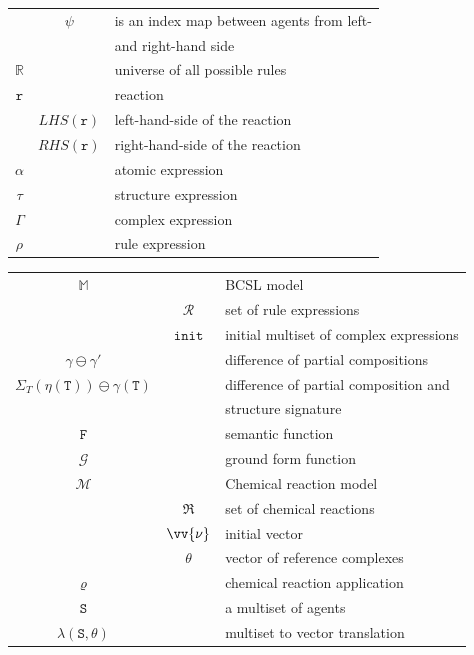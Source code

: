 \documentclass[12pt]{fithesis2}
\begin{document}
\begin{tabular}{c c | l}
 & $\psi$ & is an index map between agents from left-\\
 & & and right-hand side\\
$\mathds{R}$ & & universe of all possible rules\\
\hline 
$\mathtt{r}$ & & reaction\\
 & $LHS(\mathtt{r})$ & left-hand-side of the reaction\\
 & $RHS(\mathtt{r})$ & right-hand-side of the reaction\\
\hline 
$\alpha$ & & atomic expression\\
$\tau$ & & structure expression\\
$\Gamma$ & & complex expression\\
$\rho$ & & rule expression\\
\end{tabular}

\begin{tabular}{c c | l}
$\mathds{M}$ & & BCSL model\\
 & $\mathcal{R}$ & set of rule expressions\\
 & $\mathtt{init}$ & initial multiset of complex expressions\\
\hline 
$\gamma \ominus \gamma'$ & & difference of partial compositions\\
$\Sigma_T(\mathtt{\eta(\mathtt{T})}) \ominus \gamma(\mathtt{T})$ & & difference of partial composition and\\
 & & structure signature\\
 \hline 
$\mathtt{F}$ & & semantic function\\
$\mathcal{G}$ & & ground form function\\
\hline 
$\mathcal{M}$ & & Chemical reaction model\\
 & $\mathfrak{R}$ & set of chemical reactions\\
 & $\vv{\nu}$ & initial vector\\
 & $\theta$ & vector of reference complexes\\
\hline 
$\varrho$ & & chemical reaction application\\
$\mathtt{S}$ & & a multiset of agents\\
$\lambda(\mathtt{S}, \theta)$ & & multiset to vector translation\\
\end{tabular}

\end{document}
